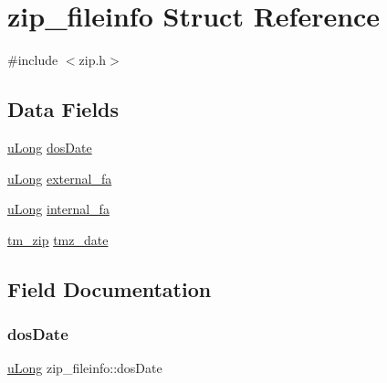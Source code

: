 \hypertarget{structzip__fileinfo}{}\section{zip\+\_\+fileinfo Struct Reference}
\label{structzip__fileinfo}


{\ttfamily \#include $<$zip.\+h$>$}

\subsection*{Data Fields}
\begin{DoxyCompactItemize}
\item 
\hyperlink{ioapi_8h_a50e9e9d5c30e481de822ad68fe537986}{u\+Long} \hyperlink{structzip__fileinfo_a0541c57e59450fbc17b2f898ca4bc9e8}{dos\+Date}
\item 
\hyperlink{ioapi_8h_a50e9e9d5c30e481de822ad68fe537986}{u\+Long} \hyperlink{structzip__fileinfo_ac0be78ded330ffd46815bafc5b6b37bb}{external\+\_\+fa}
\item 
\hyperlink{ioapi_8h_a50e9e9d5c30e481de822ad68fe537986}{u\+Long} \hyperlink{structzip__fileinfo_a396175a434b86115ce5600ab1dbb1644}{internal\+\_\+fa}
\item 
\hyperlink{zip_8h_a93b9012a85479327c6da966108d8f743}{tm\+\_\+zip} \hyperlink{structzip__fileinfo_ae09a694a598b7507d23705764c9e46fb}{tmz\+\_\+date}
\end{DoxyCompactItemize}


\subsection{Field Documentation}
\mbox{\label{structzip__fileinfo_a0541c57e59450fbc17b2f898ca4bc9e8}} 
\subsubsection{\texorpdfstring{dos\+Date}{dosDate}}
{\footnotesize\ttfamily \hyperlink{ioapi_8h_a50e9e9d5c30e481de822ad68fe537986}{u\+Long} zip\+\_\+fileinfo\+::dos\+Date}

\mbox{\label{structzip__fileinfo_ac0be78ded330ffd46815bafc5b6b37bb}} 
